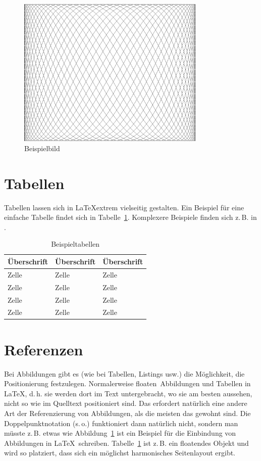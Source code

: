 \documentclass[12pt,oneside,a4paper,bibtotoc,liststotoc]{scrreprt}
\newcommand{\zB}{\mbox{z.\,B.}\xspace}
\newcommand{\dH}{\mbox{d.\,h.}\xspace}
\newcommand{\so}{\mbox{s.\,o.}\xspace}
\begin{document}
\begin{figure}[H]
  \begin{centering}
    \includegraphics[width=0.8\textwidth]{img/example.png}
    \caption{Beispielbild}
    \label{example_image}
  \end{centering}
\end{figure}

\section{Tabellen}

Tabellen lassen sich in \LaTeX extrem vielseitig gestalten. Ein
Beispiel für eine einfache Tabelle findet sich in
Tabelle~\ref{example_table}. Komplexere Beispiele finden sich \zB in
\cite[][]{WikibookTables}.

\begin{table}[h]
\centering
\begin{tabular}{l|ll}
\toprule
Überschrift & Überschrift & Überschrift \\
\midrule
Zelle & Zelle & Zelle \\
Zelle & Zelle & Zelle \\
Zelle & Zelle & Zelle \\
Zelle & Zelle & Zelle \\
\bottomrule
\end{tabular}
\caption{Beispieltabellen}
\label{example_table}
\end{table}

\section{Referenzen}

Bei Abbildungen gibt es (wie bei Tabellen, Listings usw.) die
Möglichkeit, die Positionierung festzulegen. Normalerweise \glqq
floaten\grqq\ Abbildungen und Tabellen in \LaTeX, \dH sie werden dort
im Text untergebracht, wo sie am besten aussehen, nicht so wie im
Quelltext positioniert sind. Das erfordert natürlich eine andere Art
der Referenzierung von Abbildungen, als die meisten das gewohnt
sind. Die Doppelpunktnotation (\so) funktioniert dann natürlich nicht,
sondern man müsste \zB etwas wie \glqq Abbildung~\ref{example_image}
ist ein Beispiel für die Einbindung von Abbildungen in \LaTeX \grqq\
schreiben. Tabelle~\ref{example_table} ist \zB ein floatendes Objekt
und wird so platziert, dass sich ein möglichst harmonisches
Seitenlayout ergibt.
\end{document}
